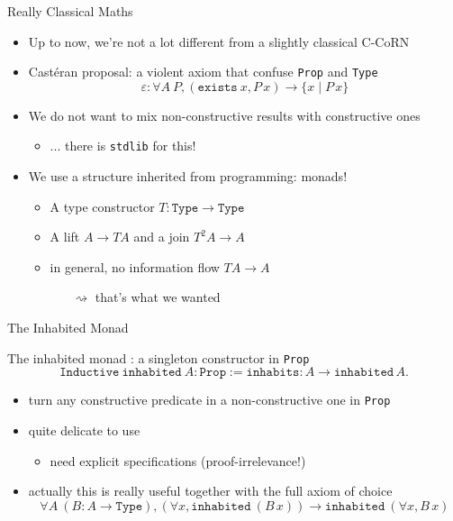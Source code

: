 \documentclass{beamer}
\begin{document}
\begin{frame}{Really Classical Maths}

\begin{itemize}
  \item Up to now, we're not a lot different from a slightly classical C-CoRN
  \item Castéran proposal: a violent axiom that confuse \texttt{Prop} and \texttt{Type}
  {\small $$\varepsilon:\forall A\ P, (\texttt{exists}\ x, P\,x) \rightarrow \{x\mid P\,x\} $$}
  \item We do not want to mix non-constructive results with constructive ones
  \begin{itemize}
    \item ... there is \texttt{stdlib} for this!
  \end{itemize}
  \item We use a structure inherited from programming: \alert{monads}!
  \begin{itemize}
    \item A type constructor $T : \texttt{Type}\rightarrow\texttt{Type}$
    \item A lift $A \rightarrow T A$ and a join $T^2 A \rightarrow A$
    \item in general, no information flow $T A \rightarrow A$
    \begin{itemize}
      \item[$\rightsquigarrow$] that's what we wanted
    \end{itemize}
  \end{itemize}
\end{itemize}

\end{frame}

\begin{frame}{The Inhabited Monad}

The inhabited monad : a singleton constructor in \texttt{Prop}
{\small$$\mathtt{Inductive\ inhabited}\ A : \mathtt{Prop} := \mathtt{inhabits} : A \rightarrow \mathtt{inhabited}\,A.$$}
\pause
\begin{itemize}
  \item turn any constructive predicate in a non-constructive one in \texttt{Prop}
  \item quite delicate to use
  \begin{itemize}
    \item need explicit specifications (proof-irrelevance!)
  \end{itemize}
  \item actually this is really useful together with the full axiom of choice
{\small$$\forall A\ (B : A \rightarrow \mathtt{Type}), (\forall x, \mathtt{inhabited}\ (B\,x)) \rightarrow
\mathtt{inhabited}\ (\forall x, B\,x)$$}
\end{itemize}

\end{frame}
\end{document}
